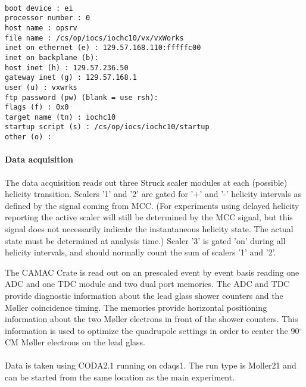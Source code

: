 {\texttt{\\
boot device          : ei \\
processor number     : 0 \\
host name            : opsrv \\
file name            : /cs/op/iocs/iochc10/vx/vxWorks \\
inet on ethernet (e) : 129.57.168.110:fffffc00 \\
inet on backplane (b): \\
host inet (h)        : 129.57.236.50 \\
gateway inet (g)     : 129.57.168.1 \\
user (u)             : vxwrks \\
ftp password (pw) (blank = use rsh): \\
flags (f)            : 0x0 \\
target name (tn)     : iochc10 \\
startup script (s)   : /cs/op/iocs/iochc10/startup \\
other (o)            : \\
}



%
\paragraph{Data acquisition}
The data acquisition reads out three Struck scaler modules at each
(possible) helicity transition. Scalers '1' and '2' are gated for '+'
and '-' helicity intervals as defined by the signal coming from
MCC. (For experiments using delayed helicity reporting the active
scaler will still be determined by the MCC signal, but this signal
does not necessarily indicate the instantaneous helicity state. The
actual state must be determined at analysis time.) Scaler '3' is gated
'on' during all helicity intervals, and should normally count the sum
of scalers '1' and '2'.

The CAMAC Crate is read out
on an prescaled event by event basis reading one ADC and one TDC
module and two dual port memories. The ADC and TDC provide diagnostic
information about the lead glass shower counters and the
M\o ller coincidence timing. The memories provide horizontal 
positioning information about the two M\o ller electrons in front
of the shower counters. This information is used to optimize
the quadrupole settings in order to center the 90$^{\circ}$ CM
M\o ller electrons on the lead glass. \\ \\
Data is taken using CODA2.1 running on cdaqs1. The run type
is Moller21 and can be started from the same location as the
main experiment.

}
